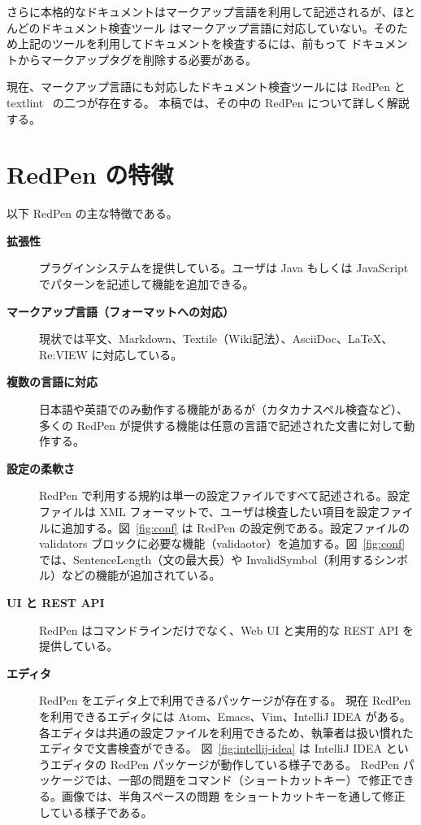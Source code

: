 さらに本格的なドキュメントはマークアップ言語を利用して記述されるが、ほとんどのドキュメント検査ツール
はマークアップ言語に対応していない。そのため上記のツールを利用してドキュメントを検査するには、前もって
ドキュメントからマークアップタグを削除する必要がある。

現在、マークアップ言語にも対応したドキュメント検査ツールには RedPen と textlint~\cite{textlint} の二つが存在する。
本稿では、その中の RedPen について詳しく解説する。

\section{RedPen の特徴}

以下 RedPen の主な特徴である。

\begin{description}
\item[{\bf 拡張性}]
  プラグインシステムを提供している。ユーザは Java もしくは JavaScript でパターンを記述して機能を追加できる。

\item[{\bf マークアップ言語（フォーマットへの対応）}]
  現状では平文、Markdown、Textile（Wiki記法）、AsciiDoc、LaTeX、Re:VIEW に対応している。

\item[{\bf 複数の言語に対応}]
  日本語や英語でのみ動作する機能があるが（カタカナスペル検査など）、多くの RedPen が提供する機能は任意の言語で記述された文書に対して動作する。

\item[{\bf 設定の柔軟さ}]
  RedPen で利用する規約は単一の設定ファイルですべて記述される。設定ファイルは XML フォーマットで、ユーザは検査したい項目を設定ファイルに追加する。図~\ref{fig:conf} は RedPen の設定例である。設定ファイルの validators ブロックに必要な機能（validaotor）を追加する。図~\ref{fig:conf} では、SentenceLength（文の最大長）や InvalidSymbol（利用するシンボル）などの機能が追加されている。

\item[{\bf UI と REST API}]
  RedPen はコマンドラインだけでなく、Web UI と実用的な REST API を提供している。

\item[{\bf エディタ}]
  RedPen をエディタ上で利用できるパッケージが存在する。
  現在 RedPen を利用できるエディタには Atom、Emacs、Vim、IntelliJ IDEA がある。
  各エディタは共通の設定ファイルを利用できるため、執筆者は扱い慣れたエディタで文書検査ができる。
  図~\ref{fig:intellij-idea} は IntelliJ IDEA というエディタの RedPen パッケージが動作している様子である。
  RedPen パッケージでは、一部の問題をコマンド（ショートカットキー）で修正できる。画像では、半角スペースの問題
  をショートカットキーを通して修正している様子である。
\end{description}

